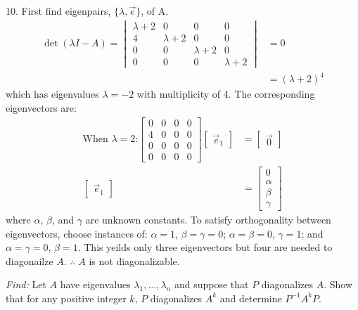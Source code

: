 \documentclass[11pt]{homework}
\begin{document}
10. First find eigenpairs, $\{ \lambda, \vec e \} $, of A.
\begin{align*}
\det( \lambda I - A) = 
  \begin{vmatrix}
    \lambda+2 & 0 & 0 & 0 \\
    4  & \lambda+2 & 0 & 0\\
    0 & 0 & \lambda+2 & 0 \\
    0 & 0 & 0 & \lambda+2
  \end{vmatrix}
  & = 0 \\
  & = (\lambda + 2)^4 
\end{align*}
which has eigenvalues $\lambda = -2$ with multiplicity of 4.
The corresponding eigenvectors are:
\begin{align*}
\text{When $\lambda = 2$:}
  \begin{bmatrix}
  0 & 0 & 0 & 0 \\
  4 & 0 & 0 & 0 \\
  0 & 0 & 0 & 0 \\
  0 & 0 & 0 & 0 
  \end{bmatrix}
  \begin{bmatrix}
    \vec e_1 
  \end{bmatrix}
  &= 
  \begin{bmatrix}
    \vec 0
  \end{bmatrix} \\ 
  \begin{bmatrix}
    \vec e_1 
  \end{bmatrix}
  &= 
  \begin{bmatrix}
    0 \\
    \alpha \\
    \beta \\
    \gamma 
  \end{bmatrix} 
\end{align*}
where $\alpha $, $\beta$, and $\gamma$ are unknown constants.
To satisfy orthogonality between eigenvectors, 
choose instances of:
$\alpha = 1$, $\beta = \gamma = 0$;
$\alpha = \beta = 0$, $ \gamma = 1$;
and
$\alpha = \gamma = 0$, $\beta = 1$.
This yeilds only three eigenvectors but four 
are needed to diagonailze $A$.
$\therefore$ $A$ is not diagonalizable.

\newpage
{}
\emph{Find:}
\newline
Let $A$ have eigenvalues $\lambda_1,...,\lambda_n$
and suppose that $P$ diagonalizes $A$.
Show that for any positive integer $k$, 
$P$ diagonalizes $A^k$ and determine $P^{-1}A^kP$.
\end{document}
